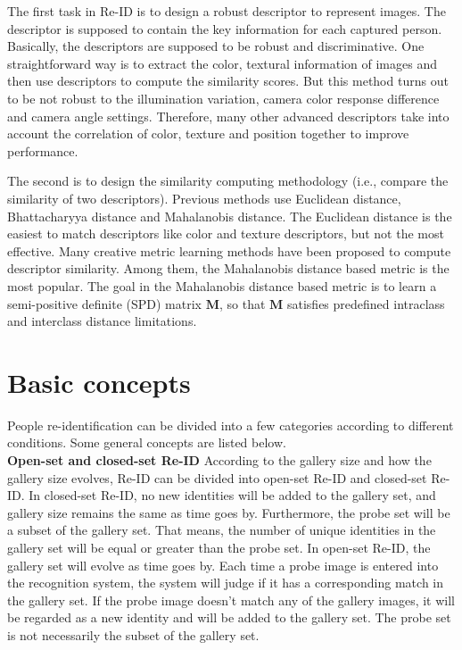 The first task in Re-ID is to design a robust descriptor to represent images. The descriptor is supposed to contain the key information for each captured person. Basically, the descriptors are supposed to be robust and discriminative. One straightforward way is to extract the color, textural information of images and then use descriptors to compute the similarity scores. But this method turns out to be not robust to the illumination variation, camera color response difference and camera angle settings.  Therefore, many other advanced descriptors take into account the correlation of color, texture and position together to improve performance.

The second is to design the similarity computing methodology (i.e., compare the similarity of two descriptors). Previous methods use Euclidean distance, Bhattacharyya distance and Mahalanobis distance. The Euclidean distance is the easiest to match descriptors like color and texture descriptors, but not the most effective. Many creative metric learning methods have been proposed to compute descriptor similarity. Among them, the Mahalanobis distance based metric is the most popular. The goal in the Mahalanobis distance based metric is to learn a semi-positive definite (SPD) matrix $\bm{M}$, so that $\bm{M}$ satisfies predefined intraclass and interclass distance limitations.
	
\section{Basic concepts}
People re-identification can be divided into a few categories according to different conditions. Some general concepts are listed below.\\
\indent \textbf{Open-set and closed-set Re-ID} \cite{REIDsurvey} According to the gallery size and how the gallery size evolves, Re-ID can be divided into open-set Re-ID and closed-set Re-ID. In closed-set Re-ID, no new identities will be added to the gallery set, and gallery size remains the same as time goes by. Furthermore, the probe set will be a subset of the gallery set. That means, the number of unique identities in the gallery set will be equal or greater than the probe set. In open-set Re-ID, the gallery set will evolve as time goes by. Each time a probe image is entered into the recognition system, the system will judge if it has a corresponding match in the gallery set. If the probe image doesn't match any of the gallery images, it will be regarded as a new identity and will be added to the gallery set. The probe set is not necessarily the subset of the gallery set. 

